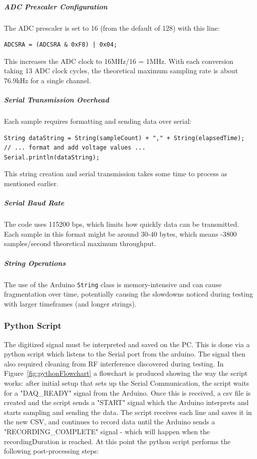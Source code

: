\subparagraph{ADC Prescaler Configuration}
The ADC prescaler is set to 16 (from the default of 128) with this line:
\begin{verbatim}
ADCSRA = (ADCSRA & 0xF8) | 0x04;
\end{verbatim}
This increases the ADC clock to 16MHz/16 = 1MHz. With each conversion taking 13 ADC clock cycles, the theoretical maximum sampling rate is about 76.9kHz for a single channel.


\subparagraph{Serial Transmission Overhead}
Each sample requires formatting and sending data over serial:
\begin{verbatim}
String dataString = String(sampleCount) + "," + String(elapsedTime);
// ... format and add voltage values ...
Serial.println(dataString);
\end{verbatim}
This string creation and serial transmission takes some time to process as mentioned earlier.

\subparagraph{Serial Baud Rate}
The code uses 115200 bps, which limits how quickly data can be transmitted. Each sample in this format might be around 30-40 bytes, which means -3800 samples/second theoretical maximum throughput.

\subparagraph{String Operations}
The use of the Arduino \texttt{String} class is memory-intensive and can cause fragmentation over time, potentially causing the slowdowns noticed during testing with larger timeframes (and longer strings).

%
%
\subsubsection{Python Script}
The digitized signal must be interpreted and saved on the PC. This is done via a python script which listens to the Serial port from the arduino. The signal then also required cleaning from RF interference discovered during testing. In Figure~\ref{fig:pythonFlowchart} a flowchart is produced showing the way the script works: after initial setup that sets up the Serial Communication, the script waits for a "DAQ\_READY" signal from the Arduino. Once this is received, a csv file is created and the script sends a "START" signal which the Arduino interprets and starts sampling and sending the data. The script receives each line and saves it in the new CSV, and continues to record data until the Arduino sends a "RECORDING\_COMPLETE" signal - which will happen when the recordingDuration is reached. At this point the python script  performs the following post-processing steps:

